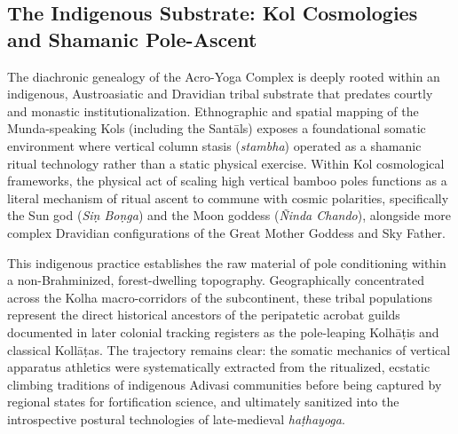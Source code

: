 \documentclass[11pt,twoside,letterpaper]{article}
\begin{document}
\subsection{The Indigenous Substrate: Kol Cosmologies and Shamanic Pole-Ascent}

The diachronic genealogy of the Acro-Yoga Complex is deeply rooted within an indigenous, Austroasiatic and Dravidian tribal substrate that predates courtly and monastic institutionalization. Ethnographic and spatial mapping of the Munda-speaking Kols (including the Santāls) exposes a foundational somatic environment where vertical column stasis (\textit{stambha}) operated as a shamanic ritual technology rather than a static physical exercise. Within Kol cosmological frameworks, the physical act of scaling high vertical bamboo poles functions as a literal mechanism of ritual ascent to commune with cosmic polarities, specifically the Sun god (\textit{Siṇ Boṇga}) and the Moon goddess (\textit{Ñinda Chando}), alongside more complex Dravidian configurations of the Great Mother Goddess and Sky Father.

This indigenous practice establishes the raw material of pole conditioning within a non-Brahminized, forest-dwelling topography. Geographically concentrated across the Kolha macro-corridors of the subcontinent, these tribal populations represent the direct historical ancestors of the peripatetic acrobat guilds documented in later colonial tracking registers as the pole-leaping Kolhāṭis and classical Kollāṭas. The trajectory remains clear: the somatic mechanics of vertical apparatus athletics were systematically extracted from the ritualized, ecstatic climbing traditions of indigenous Adivasi communities before being captured by regional states for fortification science, and ultimately sanitized into the introspective postural technologies of late-medieval \textit{haṭhayoga}.
\end{document}
